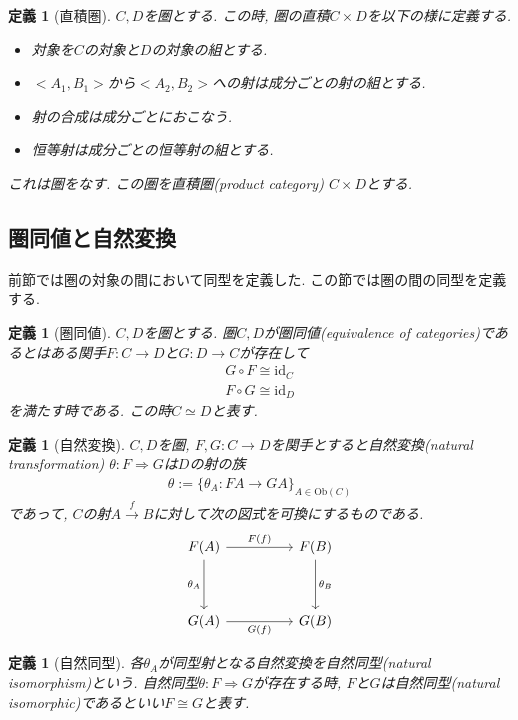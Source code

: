 \documentclass[a4paper,12pt]{ltjsarticle}
\theoremstyle{break}
\newtheorem{defn}[thm]{定義}
\newcommand{\Ob}{\mathrm{Ob}}
\newcommand{\xr}[1]{\xrightarrow{#1}}
\newcommand{\id}{\mathrm{id}}
\newcommand{\ci}{\circ}
\newcommand{\ra}{\Rightarrow}
\newcommand{\ti}{\times}
\numberwithin{equation}{section}
\begin{document}
\begin{defn}[直積圏]
  $C,D$を圏とする. 
  この時, 圏の直積$C \ti D$を以下の様に定義する. 
  \begin{itemize}
    \item 対象を$C$の対象と$D$の対象の組とする.
    \item $<A_1,B_1>$から$<A_2,B_2>$への射は成分ごとの射の組とする.
    \item 射の合成は成分ごとにおこなう.
    \item 恒等射は成分ごとの恒等射の組とする.
  \end{itemize}
  これは圏をなす. 
  この圏を直積圏(product category) $C \ti D$とする. 
\end{defn}

\subsection{圏同値と自然変換}

前節では圏の対象の間において同型を定義した. 
この節では圏の間の同型を定義する. 

\begin{defn}[圏同値]
  $C,D$を圏とする. 
  圏$C,D$が圏同値(equivalence of categories)であるとはある関手$F: C \to D$と$G: D \to C$が存在して
  \begin{align*}
  G \ci F \cong \id_C \\
  F \ci G \cong \id_D
  \end{align*}
  を満たす時である. 
  この時$C \simeq D$と表す. 
\end{defn}

\begin{defn}[自然変換]
  $C, D$を圏, $F, G: C \to D$を関手とすると自然変換(natural transformation) $\theta: F \ra G$は$D$の射の族
  \begin{align*}
    \theta := \{ \theta_A: FA \to GA \}_{A \in \Ob(C)}
  \end{align*}
  であって, $C$の射$A \xr{f} B$に対して次の図式を可換にするものである. 
  \[\begin{tikzcd}
	  {F(A)} && {F(B)} \\
	  \\
	  {G(A)} && {G(B)}
	  \arrow["{\theta_A}"', from=1-1, to=3-1]
	  \arrow["{F(f)}", from=1-1, to=1-3]
	  \arrow["{\theta_B}", from=1-3, to=3-3]
	  \arrow["{G(f)}"', from=3-1, to=3-3]
  \end{tikzcd}\]
\end{defn}

\begin{defn}[自然同型]
  各$\theta_A$が同型射となる自然変換を自然同型(natural isomorphism)という. 
  自然同型$\theta: F \ra G$が存在する時, $F$と$G$は自然同型(natural isomorphic)であるといい$F \cong G$と表す. 
\end{defn}
\end{document}
